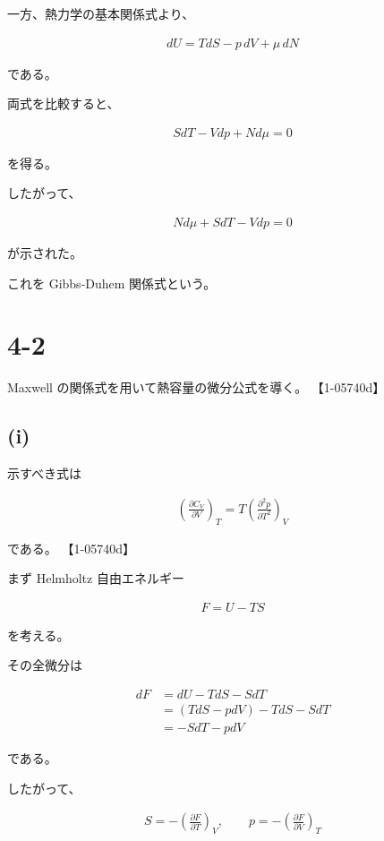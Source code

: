 \documentclass[platex,dvipdfmx,a4paper]{jsarticle}
\begin{document}
一方、熱力学の基本関係式より、

\begin{align*}
dU
=
TdS-p\,dV+\mu\,dN
\end{align*}

である。

両式を比較すると、

\begin{align*}
SdT-Vdp+Nd\mu
=
0
\end{align*}

を得る。

したがって、

\begin{align*}
Nd\mu+SdT-Vdp
=
0
\end{align*}

が示された。

これを Gibbs-Duhem 関係式という。
\section{4-2}

Maxwell の関係式を用いて熱容量の微分公式を導く。 【1-05740d】

\subsection{(i)}

示すべき式は

\begin{align*}
\left(
\frac{\partial C_V}{\partial V}
\right)_T
=
T
\left(
\frac{\partial^2 p}{\partial T^2}
\right)_V
\end{align*}

である。 【1-05740d】

まず Helmholtz 自由エネルギー

\begin{align*}
F=U-TS
\end{align*}

を考える。

その全微分は

\begin{align*}
dF
&=
dU-TdS-SdT \\
&=
(TdS-pdV)-TdS-SdT \\
&=
-SdT-pdV
\end{align*}

である。

したがって、

\begin{align*}
S
=
-\left(
\frac{\partial F}{\partial T}
\right)_V,
\qquad
p
=
-\left(
\frac{\partial F}{\partial V}
\right)_T
\end{align*}
\end{document}
